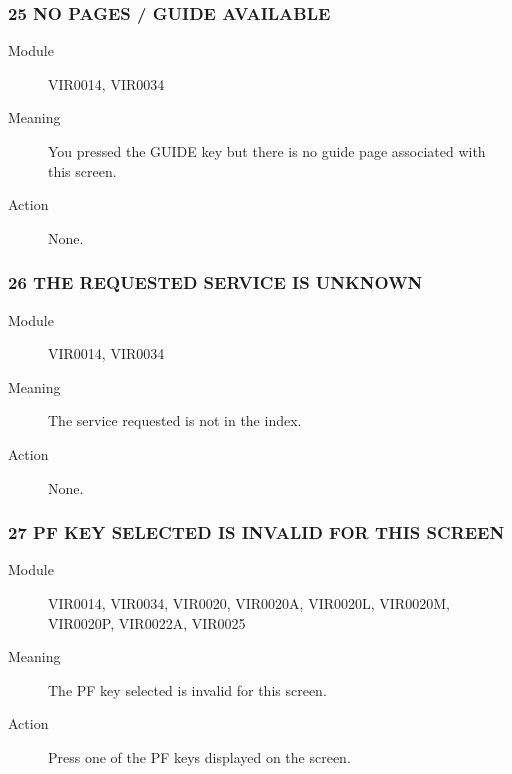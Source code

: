 \documentclass[letterpaper,10pt,english]{sphinxmanual}
\begin{document}
\subsubsection{25 NO PAGES / GUIDE AVAILABLE}
\label{\detokenize{messages:no-pages-guide-available}}\begin{description}
\item[{Module}] \leavevmode
VIR0014, VIR0034

\item[{Meaning}] \leavevmode
You pressed the GUIDE key but there is no guide page associated with this screen.

\item[{Action}] \leavevmode
None.

\end{description}


\subsubsection{26 THE REQUESTED SERVICE IS UNKNOWN}
\label{\detokenize{messages:the-requested-service-is-unknown}}\begin{description}
\item[{Module}] \leavevmode
VIR0014, VIR0034

\item[{Meaning}] \leavevmode
The service requested is not in the index.

\item[{Action}] \leavevmode
None.

\end{description}


\subsubsection{27 PF KEY SELECTED IS INVALID FOR THIS SCREEN}
\label{\detokenize{messages:pf-key-selected-is-invalid-for-this-screen}}\begin{description}
\item[{Module}] \leavevmode
VIR0014, VIR0034, VIR0020, VIR0020A, VIR0020L, VIR0020M, VIR0020P, VIR0022A, VIR0025

\item[{Meaning}] \leavevmode
The PF key selected is invalid for this screen.

\item[{Action}] \leavevmode
Press one of the PF keys displayed on the screen.

\end{description}
\end{document}
